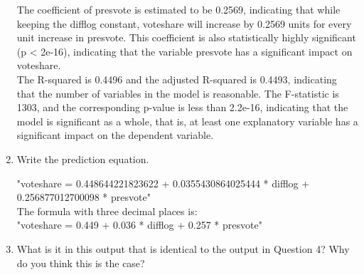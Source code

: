 \documentclass[12pt,letterpaper]{article}
\begin{document}
\begin{enumerate}
	The coefficient of presvote is estimated to be 0.2569, indicating that while keeping the difflog constant, voteshare will increase by 0.2569 units for every unit increase in presvote. This coefficient is also statistically highly significant (p < 2e-16), indicating that the variable presvote has a significant impact on voteshare.\\
	The R-squared is 0.4496 and the adjusted R-squared is 0.4493, indicating that the number of variables in the model is reasonable. The F-statistic is 1303, and the corresponding p-value is less than 2.2e-16, indicating that the model is significant as a whole, that is, at least one explanatory variable has a significant impact on the dependent variable.\\
	
		\item Write the prediction equation.	\vspace{0.5cm}
		
		"voteshare = 0.448644221823622 + 0.0355430864025444 * difflog + 0.256877012700098 * presvote"\\
		The formula with three decimal places is:\\
		"voteshare = 0.449 + 0.036 * difflog + 0.257 * presvote"\\
		\item What is it in this output that is identical to the output in Question 4? Why do you think this is the case? \vspace{0.5cm}
		\vspace{0.5cm}
		

\end{enumerate}
\end{document}
